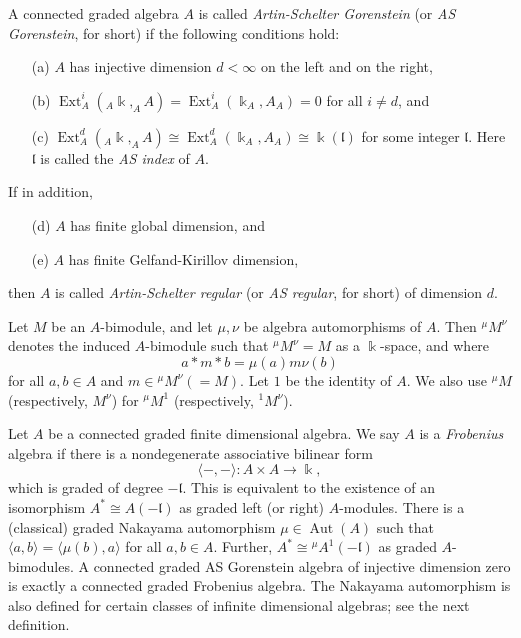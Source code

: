 \begin{definition}
\label{xxdef1.1}
A connected graded algebra $A$ is called {\it Artin-Schelter Gorenstein} 
(or {\it AS Gorenstein}, for short) if the following conditions hold:
\begin{enumerate}
\item[(a)]
$A$ has injective dimension $d<\infty$ on
the left and on the right,
\item[(b)]
$\operatorname{Ext}^i_A(_A\Bbbk,_AA)=\operatorname{Ext}^i_{A}(\Bbbk_A,A_A)=0$ for all
$i\neq d$, and
\item[(c)]
$\operatorname{Ext}^d_A(_A\Bbbk,_AA)\cong \operatorname{Ext}^d_{A}(\Bbbk_A,A_A)\cong \Bbbk({\mathfrak l})$ for some
integer ${\mathfrak l}$. Here ${\mathfrak l}$ is called the {\it AS index} of $A$.
\end{enumerate}
If in addition,
\begin{enumerate}
\item[(d)]
$A$ has finite global dimension, and
\item[(e)]
$A$ has finite Gelfand-Kirillov dimension,
\end{enumerate}
then $A$ is called {\it Artin-Schelter regular} (or {\it AS
regular}, for short) of dimension $d$.
\end{definition}

Let $M$ be an $A$-bimodule, and let $\mu, \nu$ be algebra 
automorphisms of $A$. Then ${^\mu M^\nu}$ denotes the 
induced $A$-bimodule such that ${^\mu M^\nu}=M$ 
as a $\Bbbk$-space, and where
$$a * m * b=\mu(a)m\nu(b)$$
for all $a,b\in A$ and $m\in {^\mu M^\nu}(=M)$.
Let $1$ be the identity of $A$. We also use
${^\mu M}$ (respectively, ${M^\nu}$)
for ${^\mu M^1}$ (respectively, ${^1 M^\nu}$).

Let $A$ be a connected graded finite dimensional algebra. We say 
$A$ is a {\it Frobenius} algebra if there is a nondegenerate 
associative bilinear form 
$$\langle -,- \rangle: A\times A \to \Bbbk,$$
which is graded of degree $-{\mathfrak l}$. This is equivalent to the 
existence of an isomorphism $A^*\cong A(-{\mathfrak l})$ as graded left 
(or right) $A$-modules. There is a (classical) graded Nakayama 
automorphism $\mu\in \operatorname{Aut}(A)$ such that
$\langle a,b \rangle=\langle \mu(b), a\rangle$
for all $a,b\in A$. Further, $A^*\cong {^\mu A^1}(-{\mathfrak l})$
as graded $A$-bimodules. 
A connected graded AS Gorenstein algebra of injective dimension 
zero is exactly a connected graded Frobenius algebra. 
The Nakayama automorphism is also
defined for certain classes of infinite dimensional algebras;
see the next definition.


